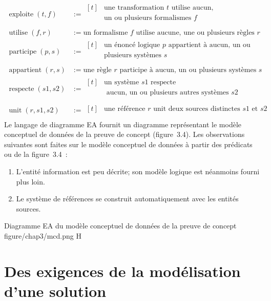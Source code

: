 {\begin{align*}
\operatorname{exploite}(t,f) &:= 
\begin{aligned}[t]
&\text{une transformation } t  \text{ utilise aucun,}\\
&\text{un ou plusieurs formalismes } f\\
\end{aligned}\\ 
\operatorname{utilise}(f,r) &:= \text{un formalisme } f  \text{ utilise aucune, une ou plusieurs règles } r\\
\operatorname{participe}(p,s) &:= 
\begin{aligned}[t]
&\text{un énoncé logique } p \text{ appartient à aucun, un ou }\\
&\text{plusieurs systèmes } s\\
\end{aligned}\\
\operatorname{appartient}(r,s) &:= \text{une règle } r  \text{ participe à aucun, un ou plusieurs systèmes } s\\
\operatorname{respecte}(s1,s2) &:= 
\begin{aligned}[t]
&\text{un système } s1 \text{ respecte } \\
&\text{ aucun, un ou plusieurs autres systèmes } s2 \\
\end{aligned}\\
\operatorname{unit}(r,s1,s2) &:= 
\begin{aligned}[t]
&\text{une référence } r \text{ unit} 
\text{ deux sources distinctes } s1 \text{ et } s2 \\
\end{aligned}
\end{align*}
Le langage de diagramme EA fournit un diagramme représentant le modèle conceptuel de données de la preuve de concept (figure~3.4). Les observations suivantes sont faites sur le modèle conceptuel de données à partir des prédicats ou de la figure~3.4~:
\begin{enumerate}[label=\alph*)]
    \item L'entité information est peu décrite; son  modèle logique est néanmoins fourni plus loin.
    \item Le système de références se construit automatiquement avec les entités sources.
\end{enumerate}
\figlandscape
{Diagramme EA du modèle conceptuel de données de la preuve de concept}
{figure/chap3/mcd.png}
{}{}{}{H}
}{}{}

\section{Des exigences de la modélisation d'une solution}

